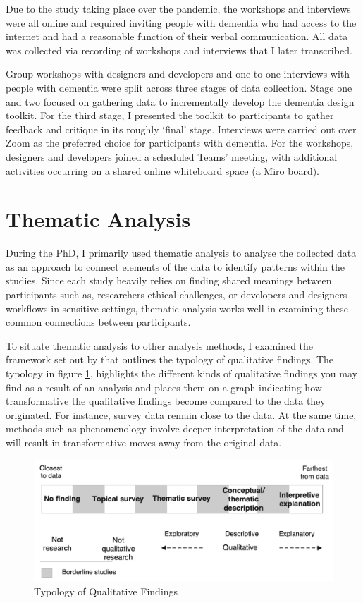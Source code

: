 Due to the study taking place over the pandemic, the workshops and interviews were all online and required inviting people with dementia who had access to the internet and had a reasonable function of their verbal communication. All data was collected via recording of workshops and interviews that I later transcribed. 

Group workshops with designers and developers and one-to-one interviews with people with dementia were split across three stages of data collection. Stage one and two focused on gathering data to incrementally develop the dementia design toolkit. For the third stage, I presented the toolkit to participants to gather feedback and critique in its roughly ‘final’ stage. Interviews were carried out over Zoom as the preferred choice for participants with dementia. For the workshops, designers and developers joined a scheduled Teams’ meeting, with additional activities occurring on a shared online whiteboard space (a Miro board). 

\section{Thematic Analysis}
\label{TA}
During the PhD, I primarily used thematic analysis to analyse the collected data as an approach to connect elements of the data to identify patterns within the studies. Since each study heavily relies on finding shared meanings between participants such as, researchers ethical challenges, or developers and designers workflows in sensitive settings, thematic analysis works well in examining these common connections between participants. 

To situate thematic analysis to other analysis methods, I examined the framework set out by \cite{sandelowski2003classifying} that outlines the typology of qualitative findings. The typology in figure \ref{fig:typology}, highlights the different kinds of qualitative findings you may find as a result of an analysis and places them on a graph indicating how transformative the qualitative findings become compared to the data they originated. For instance, survey data remain close to the data. At the same time, methods such as phenomenology involve deeper interpretation of the data and will result in transformative moves away from the original data.

\begin{figure}
    \centering
    \includegraphics[width=1\linewidth]{Images/Methodology/TypologyOfQualitativeFindings.png}
    \caption{Typology of Qualitative Findings \citep{sandelowski2003classifying}}
    \label{fig:typology}
\end{figure}

